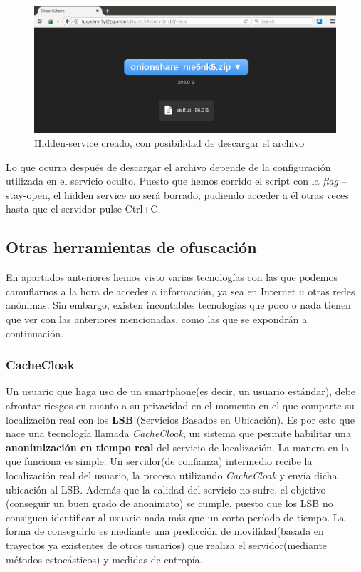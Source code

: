 \begin{figure}[h]
	\centerline{
		\mbox{\includegraphics[width=5.00in]{images/onionshare2.png}}
	}
	\caption{Hidden-service creado, con posibilidad de descargar el archivo}
	\label{fig:onionsharehiddenservice}
\end{figure} 

Lo que ocurra después de descargar el archivo depende de la configuración utilizada en el servicio oculto. Puesto que hemos corrido el script con la \textit{flag } --stay-open, el hidden service no será borrado, pudiendo acceder a él otras veces hasta que el servidor pulse Ctrl+C.

\subsection{Otras herramientas de ofuscación}

En apartados anteriores hemos visto varias tecnologías con las que podemos camuflarnos a la hora de acceder a información, ya sea en Internet u otras redes anónimas. Sin embargo, existen incontables tecnologías que poco o nada tienen que ver con las anteriores mencionadas, como las que se expondrán a continuación.

\subsubsection{CacheCloak}

Un usuario que haga uso de un smartphone(es decir, un usuario estándar), debe afrontar riesgos en cuanto a su privacidad en el momento en el que comparte su localización real con los \textbf{LSB} (Servicios Basados en Ubicación). 
Es por esto que nace una tecnología llamada \textit{CacheCloak}, un sistema que permite habilitar una \textbf{anonimización en tiempo real} del servicio de localización.
La manera en la que funciona es simple: Un servidor(de confianza) intermedio recibe la localización real del usuario, la procesa utilizando \textit{CacheCloak} y envía dicha ubicación al LSB.
Además que la calidad del servicio no sufre, el objetivo (conseguir un buen grado de anonimato) se cumple, puesto que los LSB no consiguen identificar al usuario nada más que un corto período de tiempo. 
La forma de conseguirlo es mediante una predicción de movilidad(basada en trayectos ya existentes de otros usuarios) que realiza el servidor(mediante métodos estocásticos) y medidas de entropía.

